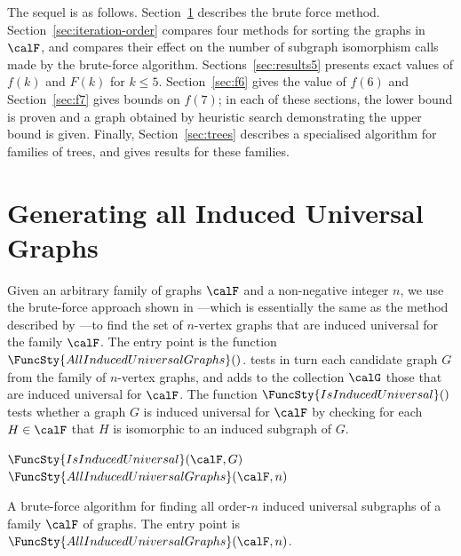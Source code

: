 The sequel is as follows.
Section~\ref{sec:method} describes the brute force method.
Section~\ref{sec:iteration-order} compares four methods for sorting
the graphs in $\calF$, and compares their effect on the number of subgraph
isomorphism calls made by the brute-force algorithm.
Sections~\ref{sec:results5} presents exact
values of $f(k)$ and $F(k)$ for $k \leq 5$.
Section~\ref{sec:f6} gives the value of $f(6)$ and
Section~\ref{sec:f7} gives bounds on $f(7)$; in each of these sections, the lower
bound is proven and a graph obtained by heuristic search demonstrating the
upper bound is given.  Finally, Section~\ref{sec:trees} describes a specialised
algorithm for families of trees, and gives results for
these families.

\section{Generating all Induced Universal Graphs}\label{sec:method}

Given an arbitrary family of graphs $\calF$ and a non-negative integer $n$,
we use the brute-force approach
shown in ---which is essentially the same as the method
described by \citet{preen_math_se}---to find the set of
$n$-vertex graphs that are induced universal for the family $\calF$.
The entry point is the function $\FuncSty{AllInducedUniversalGraphs}()$.
 tests in turn each candidate graph $G$ from the family
of $n$-vertex graphs, and adds to the collection $\calG$ those that are induced universal
for $\calF$.  The function $\FuncSty{IsInducedUniversal}()$ tests
whether a graph $G$ is induced universal for $\calF$ by checking for
each $H \in \calF$ that $H$ is isomorphic to an induced subgraph of $G$.

\begin{algorithm}[h!]
\DontPrintSemicolon
\nl $\FuncSty{IsInducedUniversal}(\calF,G)$ \;
\nl {}
\nl {}
\nl {}
\medskip
\nl $\FuncSty{AllInducedUniversalGraphs}(\calF,n)$ \label{BruteForceFun} \;
\nl {}
\nl {}
\nl {}
\caption{A brute-force algorithm for finding all order-$n$ induced universal subgraphs of a family $\calF$ of graphs.
	The entry point is $\FuncSty{AllInducedUniversalGraphs}(\calF,n)$.}
\label{alg:brute-force}
\end{algorithm}

